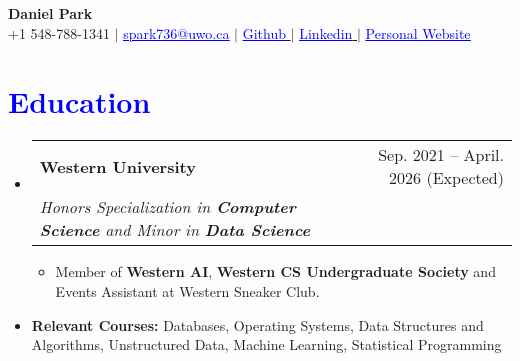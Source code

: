 \documentclass[letterpaper,11pt]{article}
\makeatletter
\newcommand{\resumeItem}[1]{
  \item \small{
    {#1 \vspace{-2pt}}
  }
}
\newcommand{\resumeSubheading}[4]{
  \vspace{-2pt}\item[]
    \begin{tabular*}{0.97\textwidth}[t]{l@{\extracolsep{\fill}}r}
      \textbf{#1} & #2 \\
      \textit{\small#3} & \textit{\small #4} \\
    \end{tabular*}\vspace{-7.3pt}
}
\newcommand{\resumeSubHeadingListStart}{\begin{itemize}[leftmargin=0.15in, label={}]}
\newcommand{\resumeSubHeadingListEnd}{\end{itemize}}
\newcommand{\resumeItemListStart}{
  \begin{itemize}[leftmargin=0.3in, label=\textbullet]
  \setlength{\itemsep}{1.5pt}  
  \setlength{\parsep}{1pt}

}
\newcommand{\resumeItemListEnd}{
  \end{itemize}\vspace{-2pt}
}
\makeatother
\begin{document}
\begin{center}
    \textbf{\Huge  Daniel Park} \\ \vspace{1pt}
    \small +1 548-788-1341 $|$ \href{}{\textcolor{blue}{\underline{spark736@uwo.ca}}} $|$ 
    \href{https://github.com/parkdaniel0225}{\textcolor{blue}{\underline{Github}} \faExternalLinkSquare*}
$|$ 
\href{https://www.linkedin.com/in/danielpark0225/}{\textcolor{blue}{\underline{Linkedin}} \faExternalLinkSquare*}
$|$ 
\href{danielpark.vercel.app/}{\textcolor{blue}{\underline{Personal Website}} \faExternalLinkSquare*}

    
\end{center}

\section{\textcolor{blue}{\textbf{Education}}}
  \resumeSubHeadingListStart
    \resumeSubheading
      {Western University}{Sep. 2021 -- April. 2026 (Expected)}
      {Honors Specialization in \textbf{Computer Science} 
      {and Minor in}
      \textbf{Data Science}
      \textbf{}}{}
    \resumeItemListStart

\resumeItem{
Member of 
\textbf{Western AI}, 
\textbf{Western CS Undergraduate Society} and Events Assistant at Western Sneaker Club. \textbf{}}
     \resumeItemListEnd
    \item \small{\textbf{Relevant Courses:} Databases, Operating Systems, Data Structures and Algorithms, Unstructured Data, Machine Learning, Statistical Programming}

  \resumeSubHeadingListEnd

 
  
\end{document}
